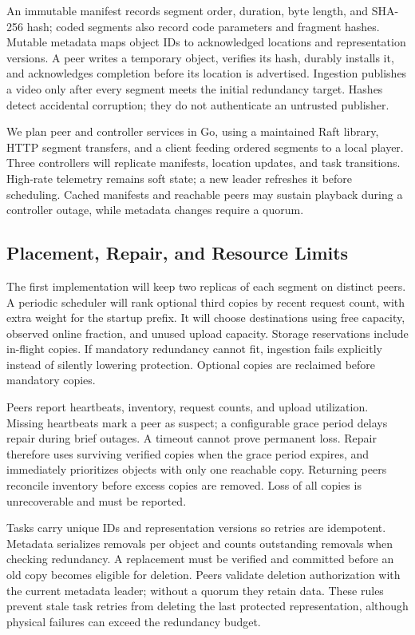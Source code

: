 \documentclass[letterpaper,twocolumn,10pt]{article}
\begin{document}
An immutable manifest records segment order, duration, byte length, and SHA-256 hash; coded segments also record code parameters and fragment hashes. Mutable metadata maps object IDs to acknowledged locations and representation versions. A peer writes a temporary object, verifies its hash, durably installs it, and acknowledges completion before its location is advertised. Ingestion publishes a video only after every segment meets the initial redundancy target. Hashes detect accidental corruption; they do not authenticate an untrusted publisher.

We plan peer and controller services in Go, using a maintained Raft library, HTTP segment transfers, and a client feeding ordered segments to a local player. Three controllers will replicate manifests, location updates, and task transitions. High-rate telemetry remains soft state; a new leader refreshes it before scheduling. Cached manifests and reachable peers may sustain playback during a controller outage, while metadata changes require a quorum.

\subsection{Placement, Repair, and Resource Limits}
The first implementation will keep two replicas of each segment on distinct peers. A periodic scheduler will rank optional third copies by recent request count, with extra weight for the startup prefix. It will choose destinations using free capacity, observed online fraction, and unused upload capacity. Storage reservations include in-flight copies. If mandatory redundancy cannot fit, ingestion fails explicitly instead of silently lowering protection. Optional copies are reclaimed before mandatory copies.

Peers report heartbeats, inventory, request counts, and upload utilization. Missing heartbeats mark a peer as suspect; a configurable grace period delays repair during brief outages. A timeout cannot prove permanent loss. Repair therefore uses surviving verified copies when the grace period expires, and immediately prioritizes objects with only one reachable copy. Returning peers reconcile inventory before excess copies are removed. Loss of all copies is unrecoverable and must be reported.

Tasks carry unique IDs and representation versions so retries are idempotent. Metadata serializes removals per object and counts outstanding removals when checking redundancy. A replacement must be verified and committed before an old copy becomes eligible for deletion. Peers validate deletion authorization with the current metadata leader; without a quorum they retain data. These rules prevent stale task retries from deleting the last protected representation, although physical failures can exceed the redundancy budget.
\end{document}
